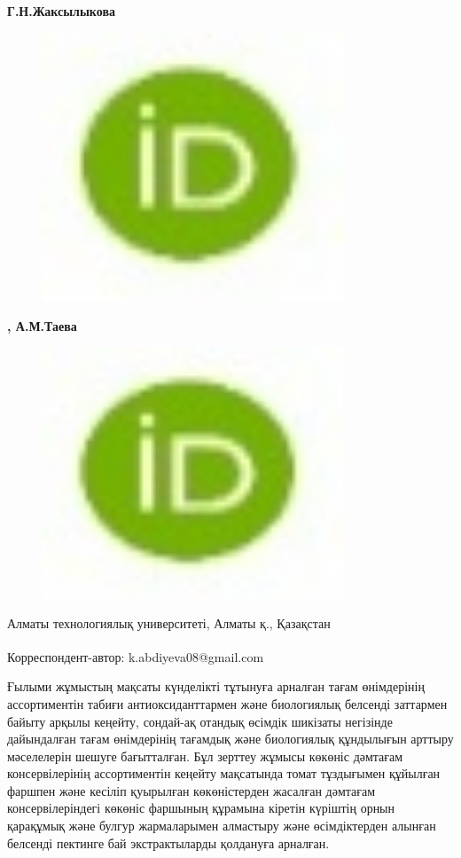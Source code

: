 {\bfseries Г.Н.Жаксылыкова}
\begin{figure}[H]
	\centering
	\includegraphics[width=0.8\textwidth]{media/pish2/image79}
	\caption*{}
\end{figure}
{\bfseries ,
А.М.Таева}
\begin{figure}[H]
	\centering
	\includegraphics[width=0.8\textwidth]{media/pish2/image80}
	\caption*{}
\end{figure}


Алматы технологиялық университеті, Алматы қ., Қазақстан

{\bfseries \textsuperscript{\envelope }}Корреспондент-автор: k.abdiyeva08@gmail.com

Ғылыми жұмыстың мақсаты күнделікті тұтынуға арналған тағам өнімдерінің
ассортиментін табиғи антиоксиданттармен және биологиялық белсенді
заттармен байыту арқылы кеңейту, сондай-ақ отандық өсімдік шикізаты
негізінде дайындалған тағам өнімдерінің тағамдық және биологиялық
құндылығын арттыру мәселелерін шешуге бағытталған. Бұл зерттеу жұмысы
көкөніс дәмтағам консервілерінің ассортиментін кеңейту мақсатында томат
тұздығымен құйылған фаршпен және кесіліп қуырылған көкөністерден
жасалған дәмтағам консервілеріндегі көкөніс фаршының құрамына кіретін
күріштің орнын қарақұмық және булгур жармаларымен алмастыру және
өсімдіктерден алынған белсенді пектинге бай экстрактыларды қолдануға
арналған.

